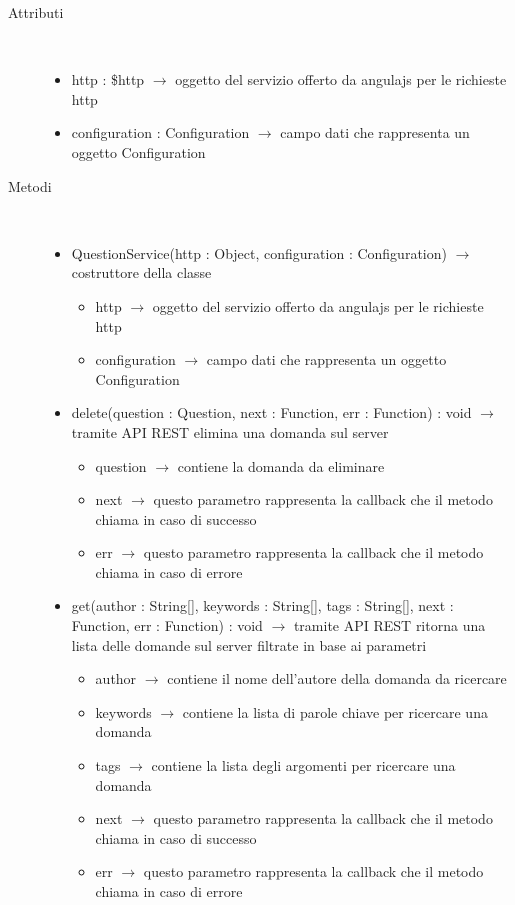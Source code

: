 \begin{description}
\item[Attributi] \hfill \\
\vspace{-7mm}
\begin{itemize}
	\item http : \$http $\rightarrow$ oggetto del servizio offerto da angulajs per le richieste http
	\item configuration : Configuration $\rightarrow$ campo dati che rappresenta un oggetto Configuration
\end{itemize}

\item[Metodi] \hfill \\
\vspace{-7mm}
\begin{itemize}
	\item QuestionService(http : Object, configuration : Configuration) $\rightarrow$ costruttore della classe\begin{itemize}
		\item http $\rightarrow$ oggetto del servizio offerto da angulajs per le richieste http
		\item configuration $\rightarrow$ campo dati che rappresenta un oggetto Configuration
	\end{itemize}
	
	\item delete(question : Question, next : Function, err : Function) : void $\rightarrow$ tramite API REST elimina una domanda sul server\begin{itemize}
		\item question $\rightarrow$ contiene la domanda da eliminare
		\item next $\rightarrow$ questo parametro rappresenta la callback che il metodo chiama in caso di successo
		\item err $\rightarrow$ questo parametro rappresenta la callback che il metodo chiama in caso di errore
	\end{itemize}
	
	\item get(author : String[], keywords : String[], tags : String[], next : Function, err : Function) : void $\rightarrow$ tramite API REST ritorna una lista delle domande sul server filtrate in base ai parametri\begin{itemize}
		\item author $\rightarrow$ contiene il nome dell'autore della domanda da ricercare 
		\item keywords $\rightarrow$ contiene la lista di parole chiave per ricercare una domanda
		\item tags $\rightarrow$ contiene la lista degli argomenti per ricercare una domanda
		\item next $\rightarrow$ questo parametro rappresenta la callback che il metodo chiama in caso di successo
		\item err $\rightarrow$ questo parametro rappresenta la callback che il metodo chiama in caso di errore
	\end{itemize}
	

\end{itemize}
\end{description}
